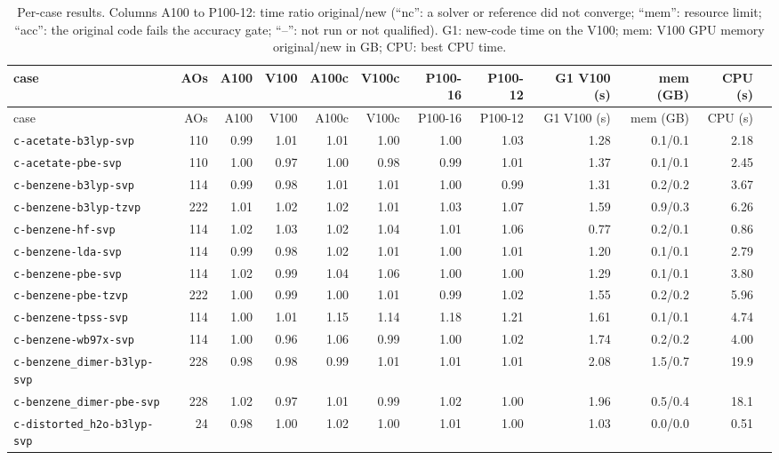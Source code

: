 \scriptsize\setlength{\tabcolsep}{3pt}
\begin{longtable}{lrrrrrrrrrrr}
\caption{Per-case results. Columns A100 to P100-12: time ratio original/new (``nc'': a solver or reference did not converge; ``mem'': resource limit; ``acc'': the original code fails the accuracy gate; ``--'': not run or not qualified). G1: new-code time on the V100; mem: V100 GPU memory original/new in GB; CPU: best CPU time.}\label{tab:percase}\\
\toprule
case & AOs & A100 & V100 & A100c & V100c & P100-16 & P100-12 & G1 V100 (s) & mem (GB) & CPU (s) \\
\midrule
\endfirsthead
\toprule case & AOs & A100 & V100 & A100c & V100c & P100-16 & P100-12 & G1 V100 (s) & mem (GB) & CPU (s) \\ \midrule \endhead
\bottomrule \endfoot
\texttt{c-acetate-b3lyp-svp} & 110 & 0.99 & 1.01 & 1.01 & 1.00 & 1.00 & 1.03 & 1.28 & 0.1/0.1 & 2.18 \\
\texttt{c-acetate-pbe-svp} & 110 & 1.00 & 0.97 & 1.00 & 0.98 & 0.99 & 1.01 & 1.37 & 0.1/0.1 & 2.45 \\
\texttt{c-benzene-b3lyp-svp} & 114 & 0.99 & 0.98 & 1.01 & 1.01 & 1.00 & 0.99 & 1.31 & 0.2/0.2 & 3.67 \\
\texttt{c-benzene-b3lyp-tzvp} & 222 & 1.01 & 1.02 & 1.02 & 1.01 & 1.03 & 1.07 & 1.59 & 0.9/0.3 & 6.26 \\
\texttt{c-benzene-hf-svp} & 114 & 1.02 & 1.03 & 1.02 & 1.04 & 1.01 & 1.06 & 0.77 & 0.2/0.1 & 0.86 \\
\texttt{c-benzene-lda-svp} & 114 & 0.99 & 0.98 & 1.02 & 1.01 & 1.00 & 1.01 & 1.20 & 0.1/0.1 & 2.79 \\
\texttt{c-benzene-pbe-svp} & 114 & 1.02 & 0.99 & 1.04 & 1.06 & 1.00 & 1.00 & 1.29 & 0.1/0.1 & 3.80 \\
\texttt{c-benzene-pbe-tzvp} & 222 & 1.00 & 0.99 & 1.00 & 1.01 & 0.99 & 1.02 & 1.55 & 0.2/0.2 & 5.96 \\
\texttt{c-benzene-tpss-svp} & 114 & 1.00 & 1.01 & 1.15 & 1.14 & 1.18 & 1.21 & 1.61 & 0.1/0.1 & 4.74 \\
\texttt{c-benzene-wb97x-svp} & 114 & 1.00 & 0.96 & 1.06 & 0.99 & 1.00 & 1.02 & 1.74 & 0.2/0.2 & 4.00 \\
\texttt{c-benzene\_dimer-b3lyp-svp} & 228 & 0.98 & 0.98 & 0.99 & 1.01 & 1.01 & 1.01 & 2.08 & 1.5/0.7 & 19.9 \\
\texttt{c-benzene\_dimer-pbe-svp} & 228 & 1.02 & 0.97 & 1.01 & 0.99 & 1.02 & 1.00 & 1.96 & 0.5/0.4 & 18.1 \\
\texttt{c-distorted\_h2o-b3lyp-svp} & 24 & 0.98 & 1.00 & 1.02 & 1.00 & 1.01 & 1.00 & 1.03 & 0.0/0.0 & 0.51 \\

\end{longtable}
